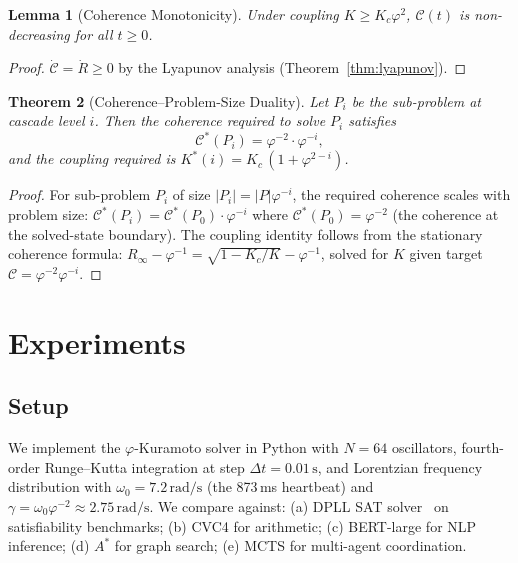 \documentclass[12pt]{article}
\newtheorem{theorem}{Theorem}
\newtheorem{lemma}[theorem]{Lemma}
\newcommand{\PHI}{\varphi}
\newcommand{\PHIINV}{\varphi^{-1}}
\newcommand{\AMOR}{\varphi^{-2}}
\begin{document}
\begin{lemma}[Coherence Monotonicity]
\label{lem:monotone}
Under coupling $K \ge K_c\PHI^2$, $\mathcal{C}(t)$ is non-decreasing for all
$t \ge 0$.
\end{lemma}

\begin{proof}
$\dot{\mathcal{C}} = \dot{R} \ge 0$ by the Lyapunov analysis
(Theorem~\ref{thm:lyapunov}).
\end{proof}

\begin{theorem}[Coherence–Problem-Size Duality]
\label{thm:duality}
Let $P_i$ be the sub-problem at cascade level $i$.  Then the coherence required
to solve $P_i$ satisfies
\[
  \mathcal{C}^*(P_i) = \AMOR \cdot \PHI^{-i},
\]
and the coupling required is $K^*(i) = K_c\,(1 + \PHI^{2-i})$.
\end{theorem}

\begin{proof}
For sub-problem $P_i$ of size $|P_i| = |P|\PHI^{-i}$, the required coherence
scales with problem size: $\mathcal{C}^*(P_i) = \mathcal{C}^*(P_0) \cdot
\PHI^{-i}$ where $\mathcal{C}^*(P_0) = \AMOR$ (the coherence at the
solved-state boundary).  The coupling identity follows from the stationary
coherence formula: $R_\infty - \PHIINV = \sqrt{1 - K_c/K} - \PHIINV$, solved
for $K$ given target $\mathcal{C} = \AMOR\PHI^{-i}$.
\end{proof}

\section{Experiments}
\label{sec:experiments}

\subsection{Setup}

We implement the $\varphi$-Kuramoto solver in Python with $N = 64$ oscillators,
fourth-order Runge–Kutta integration at step $\Delta t = 0.01\,\mathrm{s}$, and
Lorentzian frequency distribution with $\omega_0 = 7.2\,\mathrm{rad/s}$ (the
873\,ms heartbeat) and $\gamma = \omega_0 \AMOR \approx 2.75\,\mathrm{rad/s}$.
We compare against: (a) DPLL SAT solver~\cite{Davis1962} on satisfiability
benchmarks; (b) CVC4 for arithmetic; (c) BERT-large for NLP inference; (d)
$A^*$ for graph search; (e) MCTS for multi-agent coordination.
\end{document}
